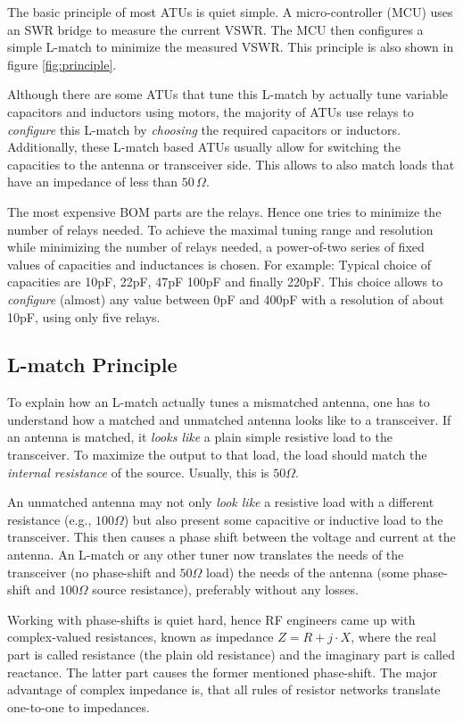 \documentclass[10pt, a4paper,twoside]{scrartcl}
\begin{document}
The basic principle of most ATUs is quiet simple. A micro-controller (MCU) uses an SWR bridge to measure the current VSWR. The MCU then configures a simple L-match to minimize the measured VSWR. This principle is also shown in figure 
\ref{fig:principle}. 

Although there are some ATUs that tune this L-match by actually tune variable capacitors and inductors using motors, the majority of ATUs use relays to \emph{configure} this L-match by \emph{choosing} the required capacitors or inductors. Additionally, these L-match based ATUs usually allow for switching the capacities to the antenna or transceiver side. This allows to also match loads that have an impedance of less than $50\,\Omega$. 

The most expensive BOM parts are the relays. Hence one tries to minimize the number of relays needed. To achieve the maximal tuning range and resolution while minimizing the number of relays needed, a power-of-two series of fixed values of capacities and inductances is chosen. For example: Typical choice of capacities are 10pF, 22pF, 47pF 100pF and finally 220pF. This choice allows to \emph{configure} (almost) any value between 0pF and 400pF with a resolution of about 10pF, using only five relays.

\subsection{L-match Principle}
To explain how an L-match actually tunes a mismatched antenna, one has to understand how a matched and unmatched antenna looks like to a transceiver. If an antenna is matched, it \emph{looks like} a plain simple resistive load to the transceiver. To maximize the output to that load, the load should match the \emph{internal resistance} of the source. Usually, this is $50\Omega$. 

An unmatched antenna may not only \emph{look like} a resistive load with a different resistance (e.g., $100\Omega$) but also present some capacitive or inductive load to the transceiver. This then causes a phase shift between the voltage and current at the antenna. An L-match or any other tuner now translates the needs of the transceiver (no phase-shift and $50\Omega$ load) the needs of the antenna (some phase-shift and $100\Omega$ source resistance), preferably without any losses. 

Working with phase-shifts is quiet hard, hence RF engineers came up with complex-valued resistances, known as impedance $Z = R + j\cdot X$, where the real part is called resistance (the plain old resistance) and the imaginary part is called reactance. The latter part causes the former mentioned phase-shift. The major advantage of complex impedance is, that all rules of resistor networks translate one-to-one to impedances.
\end{document}
